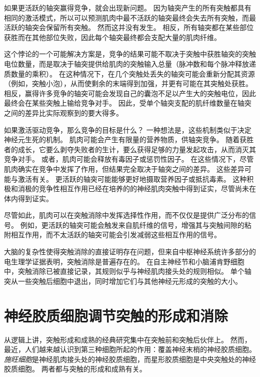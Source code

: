 如果更活跃的轴突赢得竞争，就会出现新问题。
因为轴突产生的所有突触都具有相同的激活模式，所以可以预测肌肉中最不活跃的轴突最终会失去所有突触，而最活跃的轴突会保留所有突触。
然而这并没有发生。
相反，所有轴突都在某些部位获胜而在其他部位失败，因此每个轴突最终都会支配大量的肌肉纤维。


这个悖论的一个可能解决方案是，竞争的结果可能不取决于突触中获胜轴突的突触电位数量，而是取决于轴突提供给肌肉的突触输入总量（脉冲数和每个脉冲释放递质数量的乘积）。
在这种情况下，在几个突触处丢失的轴突可能会重新分配其资源（例如，突触小泡），从而使剩余的末端得到加强，并更有可能在其突触处获胜。
相反，赢得许多竞争的轴突可能会发现自己的囊泡不足以产生大的突触电位，因此最终会在某些突触上输给竞争对手。
因此，受单个轴突支配的肌纤维数量在轴突之间的差异比实际观察到的要大得多。


如果激活驱动竞争，那么竞争的目标是什么？
一种想法是，这些机制类似于决定神经元生死的机制。
肌肉可能会产生有限量的营养物质，供轴突竞争。
随着获胜者的成长，它要么剥夺失败者的生计，要么获得足够的力量发起攻击，从而消灭其竞争对手。
或者，肌肉可能会释放有毒因子或惩罚性因子。
在这些情况下，尽管肌肉确实在竞争中发挥了作用，但结果完全取决于轴突之间的差异。
这些差异可能与激活有关。
更活跃的轴突可能能够更好地摄取营养因子或抵抗毒素。
这种积极和消极的竞争性相互作用已经在培养的的神经肌肉突触中得到证实，尽管尚未在体内得到证实。


尽管如此，肌肉可以在突触消除中发挥选择性作用，而不仅仅是提供广泛分布的信号。
例如，更活跃的轴突可能会触发来自肌纤维的信号，增强其与突触间隙的粘附相互作用，而不太活跃的轴突可能会引发减弱这些相互作用的信号。


大脑的复杂性使得突触消除的直接证明存在问题，但来自中枢神经系统许多部分的电生理学证据表明，突触消除是普遍存在的。
在自主神经节和小脑浦肯野细胞中，突触消除已被直接记录，其规则似乎与神经肌肉接头处的规则相似。
单个轴突从一些突触后细胞中退出，同时增加它们与其他神经元形成的突触的大小。



\section{神经胶质细胞调节突触的形成和消除}

从逻辑上讲，突触形成和成熟的经典研究集中在突触前和突触后伙伴上。
然而，最近，人们越来越认识到第三种细胞所起的作用：覆盖神经末梢的神经胶质细胞。
\textit{施旺细胞}是神经肌肉接头处的神经胶质细胞，而星形胶质细胞是中央突触处的神经胶质细胞。
两者都与突触的形成和成熟有关。


